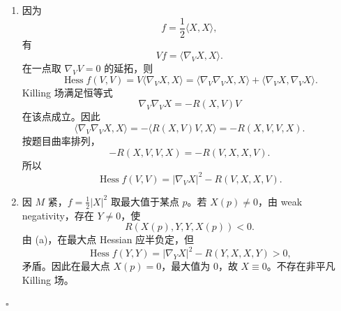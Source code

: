 \documentclass[UTF8,12pt]{ctexart}
\newenvironment{solution}{%
  \par\medskip
  \noindent{\bfseries 解答}\quad\ignorespaces
}{\hfill$\square$\par\medskip}
\begin{document}
\begin{solution}
\begin{enumerate}[label=(\alph*)]
\item 因为
\[
f=\frac12\langle X,X\rangle,
\]
有
\[
Vf=\langle\nabla_VX,X\rangle.
\]
在一点取 \(\nabla_VV=0\) 的延拓，则
\[
\operatorname{Hess}f(V,V)
=V\langle\nabla_VX,X\rangle
=\langle\nabla_V\nabla_VX,X\rangle+\langle\nabla_VX,\nabla_VX\rangle.
\]
Killing 场满足恒等式
\[
\nabla_V\nabla_VX=-R(X,V)V
\]
在该点成立。因此
\[
\langle\nabla_V\nabla_VX,X\rangle
=-\langle R(X,V)V,X\rangle
=-R(X,V,V,X).
\]
按题目曲率排列，
\[
-R(X,V,V,X)=-R(V,X,X,V).
\]
所以
\[
\operatorname{Hess}f(V,V)
=|\nabla_VX|^2-R(V,X,X,V).
\]

\item 因 \(M\) 紧，\(f=\frac12|X|^2\) 取最大值于某点 \(p\)。若 \(X(p)\ne0\)，由 weak negativity，存在 \(Y\ne0\)，使
\[
R(X(p),Y,Y,X(p))<0.
\]
由 (a)，在最大点 Hessian 应半负定，但
\[
\operatorname{Hess}f(Y,Y)
=|\nabla_YX|^2-R(Y,X,X,Y)>0,
\]
矛盾。因此在最大点 \(X(p)=0\)，最大值为 \(0\)，故 \(X\equiv0\)。不存在非平凡 Killing 场。
\end{enumerate}
\end{solution}
\end{document}
